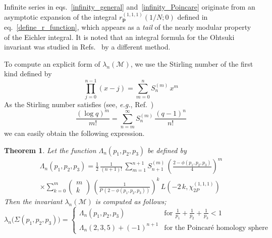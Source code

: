 \documentclass[12pt,reqno]{amsart}
\numberwithin{equation}{section}
\newtheorem{theorem}{Theorem}
\begin{document}
Infinite series in eqs.~\eqref{infinity_general}
and~\eqref{infinity_Poincare}
originate from an asymptotic expansion of the integral
$r_{\boldsymbol{p}}^{(1,1,1)}(1/N ; 0)$ defined in
eq.~\eqref{define_r_function}, which appears as a \emph{tail} of the
nearly modular property of the Eichler integral.
It is noted that an integral formula for the Ohtsuki invariant was studied in Refs.~
by a different method.

To compute an explicit form of $\lambda_n(\mathcal{M})$,
we use the  Stirling number of the first kind defined by
\begin{equation}
  \prod_{j=0}^{n-1}(x - j)
  =
  \sum_{m=0}^n
  S_n^{(m)}  \, x^m
\end{equation}
As  the Stirling number satisfies
(see, \emph{e.g.}, Ref.~)
\begin{equation}
  \frac{(\log q)^m}{m!}
  =
  \sum_{n=m}^\infty
  S_n^{(m)} \,
  \frac{ (q -1 )^n }{n!}
\end{equation}
we can easily obtain the following expression.

\begin{theorem}
  Let the function $\Lambda_n(p_1,p_2,p_3)$ be defined by
  \begin{multline}
    \Lambda_{n}(p_1,p_2,p_3)
    =
    \frac{1}{2} \, \frac{1}{(n+1)!} \,
    \sum_{m=1}^{n+1}
    S_{n+1}^{(m)} \,
    \left(
      \frac{2-\phi(p_1,p_2,p_3)}{4} 
    \right)^m
    \\
    \times
    \sum_{k=0}^m
    \begin{pmatrix}
      m \\
      k
    \end{pmatrix}
    \, 
    \left(
      \frac{1}{P \, (2 - \phi(p_1,p_2,p_3))}
    \right)^k \,
    L(-2 \, k , \chi_{2 P}^{(1,1,1)})
  \end{multline}
  Then the invariant $\lambda_n(\mathcal{M})$ is computed as follows;
  \begin{equation}
    \label{lambda_Brieskorn}
    \lambda_{n}\bigl( \Sigma(p_1, p_2, p_3) \bigr)
    =
    \begin{cases}
      \Lambda_n( p_1,p_2, p_3)
      &
      \text{for $\displaystyle
        \frac{1}{p_1} +     \frac{1}{p_2}+    \frac{1}{p_3} <1
        $}
      \\[5mm]
%
      \Lambda_n(2,3,5) + (-1)^{n+1}
      &
      \text{for the Poincar{\'e} homology sphere}
    \end{cases}
  \end{equation}
\end{theorem}
\end{document}
